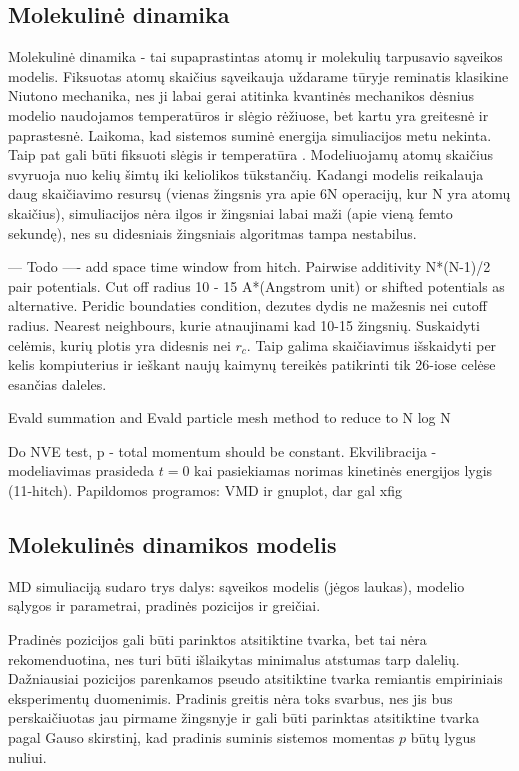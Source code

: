 \subsection{Molekulinė dinamika}
\label{sec:molecular_dynamics}


Molekulinė dinamika - tai supaprastintas atomų ir molekulių tarpusavio sąveikos modelis.
Fiksuotas atomų skaičius sąveikauja uždarame tūryje reminatis klasikine Niutono mechanika,
nes ji labai gerai atitinka kvantinės mechanikos dėsnius modelio naudojamos temperatūros ir slėgio rėžiuose,
bet kartu yra greitesnė ir paprastesnė.
Laikoma, kad sistemos suminė energija simuliacijos metu nekinta.
Taip pat gali būti fiksuoti slėgis ir temperatūra \cite{hitch}.
Modeliuojamų atomų skaičius svyruoja nuo kelių šimtų iki keliolikos tūkstančių.
Kadangi modelis reikalauja daug skaičiavimo resursų (vienas žingsnis yra apie 6N operacijų, kur N yra atomų skaičius),
simuliacijos nėra ilgos ir žingsniai labai maži (apie vieną femto sekundę), nes su didesniais žingsniais algoritmas tampa nestabilus.


--- Todo ---- add space time window from hitch.
Pairwise additivity N*(N-1)/2 pair potentials.
Cut off radius 10 - 15 A*(Angstrom unit) or shifted potentials as alternative.
Peridic boundaties condition, dezutes dydis ne mažesnis nei cutoff radius.
Nearest neighbours, kurie atnaujinami kad 10-15 žingsnių.
Suskaidyti celėmis, kurių plotis yra didesnis nei \(r_c\). Taip galima skaičiavimus išskaidyti per kelis kompiuterius ir ieškant naujų kaimynų tereikės patikrinti tik 26-iose celėse esančias daleles.

Evald summation and Evald particle mesh method to reduce to N log N

Do NVE test, p - total momentum should be constant.
Ekvilibracija - modeliavimas prasideda \(t = 0\) kai pasiekiamas norimas kinetinės energijos lygis (11-hitch).
Papildomos programos: VMD ir gnuplot, dar gal xfig



\subsection{Molekulinės dinamikos modelis}
\label{sec:molecular_dynamics_model}


MD simuliaciją sudaro trys dalys: sąveikos modelis (jėgos laukas), modelio sąlygos ir parametrai, pradinės pozicijos ir greičiai.

Pradinės pozicijos gali būti parinktos atsitiktine tvarka, bet tai nėra rekomenduotina, nes turi būti išlaikytas minimalus atstumas tarp dalelių.
Dažniausiai pozicijos parenkamos pseudo atsitiktine tvarka remiantis empiriniais eksperimentų duomenimis.
Pradinis greitis nėra toks svarbus, nes jis bus perskaičiuotas jau pirmame žingsnyje ir gali būti parinktas atsitiktine tvarka pagal Gauso skirstinį,
kad pradinis suminis sistemos momentas \(p\) būtų lygus nuliui.


